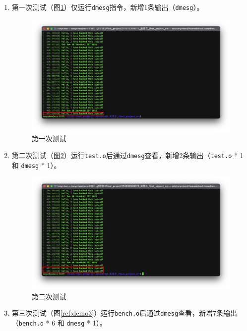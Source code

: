 \documentclass[UTF8]{ctexrep}
\begin{document}
    \begin{enumerate}
        \item 第一次测试（图\ref{ref:demo1}）仅运行\texttt{dmesg}指令，新增1条输出（\texttt{dmesg}）。
        \begin{figure}[h!]
            \centering
            \includegraphics[width=15cm,keepaspectratio]{images/demo1.png}
            \caption{第一次测试}
            \label{ref:demo1}
        \end{figure}
        \clearpage
        \item 第二次测试（图\ref{ref:demo2}）运行\texttt{test.o}后通过\texttt{dmesg}查看，新增2条输出（\texttt{test.o} * 1 和 \texttt{dmesg} * 1）。
        \begin{figure}[h!]
            \centering
            \includegraphics[width=15cm,keepaspectratio]{images/demo2.png}
            \caption{第二次测试}
            \label{ref:demo2}
        \end{figure}
        \item 第三次测试（图\ref{ref:demo3}）运行\texttt{bench.o}后通过\texttt{dmesg}查看，新增7条输出（\texttt{bench.o} * 6 和 \texttt{dmesg} * 1）。

\end{enumerate}
\end{document}
